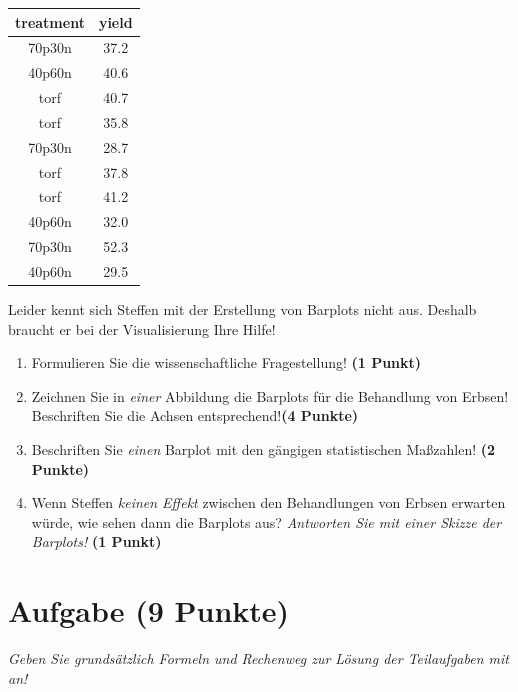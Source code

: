 \documentclass[a4paper, 9pt]{scrartcl}\usepackage[]{graphicx}\usepackage[]{xcolor}
\begin{document}
\begin{table}[!h]
\centering
\begin{tabular}{cc}
\toprule
treatment & yield\\
\midrule
70p30n & 37.2\\
40p60n & 40.6\\
torf & 40.7\\
torf & 35.8\\
70p30n & 28.7\\
\addlinespace
torf & 37.8\\
torf & 41.2\\
40p60n & 32.0\\
70p30n & 52.3\\
40p60n & 29.5\\
\bottomrule
\end{tabular}
\end{table}



Leider kennt sich Steffen mit der Erstellung von Barplots nicht aus. Deshalb braucht er bei der Visualisierung Ihre Hilfe!

\begin{enumerate}
\item Formulieren Sie die wissenschaftliche Fragestellung! \textbf{(1 Punkt)}
\item Zeichnen Sie in \textit{einer} Abbildung die Barplots für die Behandlung von Erbsen! Beschriften Sie die Achsen entsprechend!\textbf{(4 Punkte)}
\item Beschriften Sie \textit{einen} Barplot mit den gängigen statistischen Maßzahlen! \textbf{(2 Punkte)}
\item Wenn Steffen \textit{keinen Effekt} zwischen den Behandlungen von Erbsen erwarten würde, wie sehen dann die Barplots aus? \textit{Antworten Sie mit einer Skizze der Barplots!}
  \textbf{(1 Punkt)}
\end{enumerate} 
\clearpage

\section{Aufgabe \hfill (9 Punkte)}

\textit{Geben Sie grundsätzlich Formeln und Rechenweg zur Lösung der Teilaufgaben mit an!} \\[1Ex]
 
\end{document}
